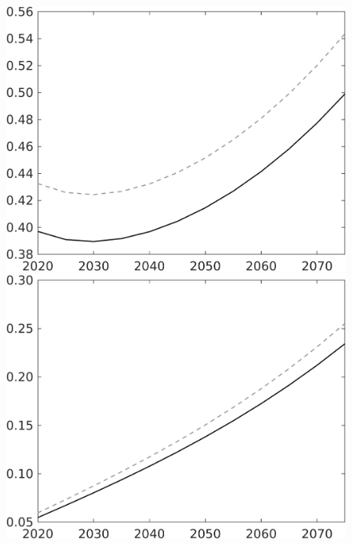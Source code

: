 \documentclass[12pt]{article}
\begin{document}
\begin{figure}[h!!]
\begin{minipage}[]{0.32\textwidth}
	\end{minipage}	
\begin{minipage}[]{0.32\textwidth}
\includegraphics[width=1\textwidth]{../../codding_model/own_basedOnFried/optimalPol_010922_revision/figures/all_13Sept22/CompTaul_Equlab_LFBAU_Reg0_F_spillover0_nsk1_xgr1_knspil0_sep1_countec0_GovRev0_etaa0.79_lgd0.png}
\end{minipage}	
\begin{minipage}[]{0.32\textwidth}
\includegraphics[width=1\textwidth]{../../codding_model/own_basedOnFried/optimalPol_010922_revision/figures/all_13Sept22/CompTaul_Equlab_LFBAU_Reg0_G_spillover0_nsk1_xgr1_knspil0_sep1_countec0_GovRev0_etaa0.79_lgd0.png}

\end{minipage}
\end{figure}
\end{document}
